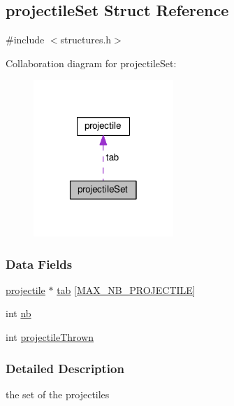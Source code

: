 \hypertarget{structprojectile_set}{\subsection{projectile\-Set Struct Reference}
\label{structprojectile_set}
}


{\ttfamily \#include $<$structures.\-h$>$}



Collaboration diagram for projectile\-Set\-:\nopagebreak
\begin{figure}[H]
\begin{center}
\leavevmode
\includegraphics[width=150pt]{structprojectile_set__coll__graph}
\end{center}
\end{figure}
\subsubsection*{Data Fields}
\begin{DoxyCompactItemize}
\item 
\hyperlink{structprojectile}{projectile} $\ast$ \hyperlink{structprojectile_set_ac4cbcd75bc678f0ad2b2d416ce87dc6d}{tab} \mbox{[}\hyperlink{const_8h_a180d2c389d68d43eb0e3df2d573fecf4}{M\-A\-X\-\_\-\-N\-B\-\_\-\-P\-R\-O\-J\-E\-C\-T\-I\-L\-E}\mbox{]}
\item 
int \hyperlink{structprojectile_set_ab310c6afcc676eab3930dce2650511c0}{nb}
\item 
int \hyperlink{structprojectile_set_accfd9d1d6194770a3368821b58ffc3b6}{projectile\-Thrown}
\end{DoxyCompactItemize}


\subsubsection{Detailed Description}
the set of the projectiles 

